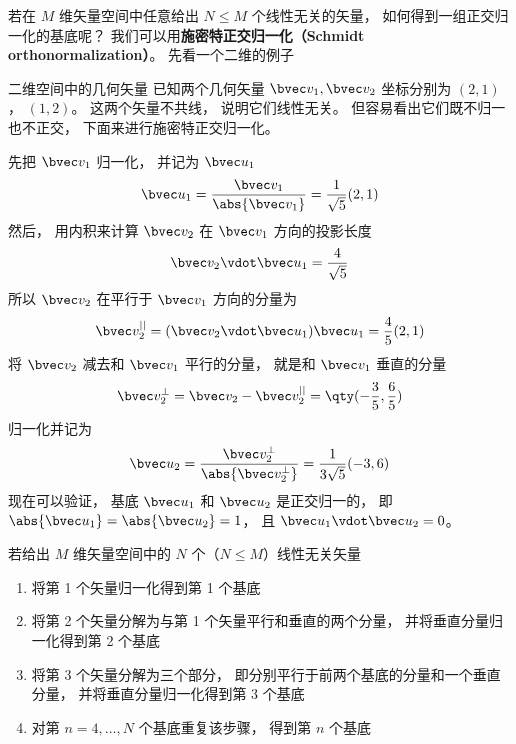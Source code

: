 

若在 $M$ 维矢量空间中任意给出 $N \leqslant M$ 个线性无关的矢量， 如何得到一组正交归一化的基底呢？ 我们可以用\textbf{施密特正交归一化（Schmidt orthonormalization）}。 先看一个二维的例子

\begin{example}{二维空间中的几何矢量}
已知两个几何矢量 $\bvec v_1, \bvec v_2$ 坐标分别为 $(2, 1)$， $(1, 2)$。 这两个矢量不共线， 说明它们线性无关。 但容易看出它们既不归一也不正交， 下面来进行施密特正交归一化。

先把 $\bvec v_1$ 归一化， 并记为 $\bvec u_1$
\begin{equation}
\bvec u_1 = \frac{\bvec v_1}{\abs{\bvec v_1}} = \frac{1}{\sqrt{5}} (2, 1)
\end{equation}
然后， 用内积来计算 $\bvec v_2$ 在 $\bvec v_1$ 方向的投影长度
\begin{equation}
\bvec v_2 \vdot \bvec u_1 = \frac{4}{\sqrt{5}}
\end{equation}
所以 $\bvec v_2$ 在平行于 $\bvec v_1$ 方向的分量为
\begin{equation}
\bvec v_2^{||} =  (\bvec v_2 \vdot \bvec u_1)\bvec u_1 = \frac{4}{5} (2, 1)
\end{equation}
将 $\bvec v_2$ 减去和 $\bvec v_1$ 平行的分量， 就是和 $\bvec v_1$ 垂直的分量
\begin{equation}
\bvec v_2^\bot = \bvec v_2 - \bvec v_2^{||} = \qty(-\frac35, \frac65)
\end{equation}
归一化并记为
\begin{equation}
\bvec u_2 = \frac{\bvec v_2^\bot}{\abs{\bvec v_2^\bot}} = \frac{1}{3\sqrt{5}} (-3, 6)
\end{equation}
现在可以验证， 基底 $\bvec u_1$ 和 $\bvec u_2$ 是正交归一的， 即 $\abs{\bvec u_1} = \abs{\bvec u_2} = 1$， 且 $\bvec u_1 \vdot \bvec u_2 = 0$。
\end{example}

若给出 $M$ 维矢量空间中的 $N$ 个（$N \leqslant M$）线性无关矢量
\begin{enumerate}
\item 将第 1 个矢量归一化得到第 1 个基底
\item 将第 2 个矢量分解为与第 1 个矢量平行和垂直的两个分量， 并将垂直分量归一化得到第 2 个基底
\item 将第 3 个矢量分解为三个部分， 即分别平行于前两个基底的分量和一个垂直分量， 并将垂直分量归一化得到第 3 个基底
\item 对第 $n = 4, \dots , N$ 个基底重复该步骤， 得到第 $n$ 个基底
\end{enumerate}

